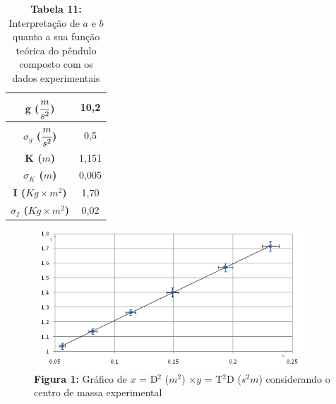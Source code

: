 \documentclass{article}
\begin{document}
\begin{table}[!ht]
	\begin{center}
		\caption*{\textbf{Tabela 11:} Interpretação de $a$ e $b$ quanto a sua função teórica do pêndulo composto com os dados experimentais}
		\begin{tabular}{| c | c |}
			\hline 
			\multicolumn{0}{|c|}{\textbf{g ($\cfrac{m}{s^2}$)}} & 10,2 \\ \hline
			\multicolumn{0}{|c|}{\textbf{$\sigma_g$ ($\cfrac{m}{s^2}$)}} & 0,5 \\ \hline
			\multicolumn{0}{|c|}{\textbf{K ($m$)}} & 1,151 \\ \hline
			\multicolumn{0}{|c|}{\textbf{$\sigma_K$ ($m$)}} & 0,005 \\ \hline
			\multicolumn{0}{|c|}{\textbf{I ($Kg\times m^2$)}} & 1,70 \\ \hline
			\multicolumn{0}{|c|}{\textbf{$\sigma_I$ ($Kg\times m^2$)}} & 0,02 \\ \hline
		\end{tabular}
	\end{center}
\end{table}

\begin{figure}[!ht]
 	\centering
		\includegraphics[width=0.9\textwidth]{experimentalmente}
	\caption*{\textbf{Figura 1:} Gráfico de $x$ = D$^2$ ($m^2$) $\times y$ =  T$^2$D ($s^2m$) considerando o centro de massa experimental}
\end{figure}

\afterpage{\clearpage}
\end{document}
